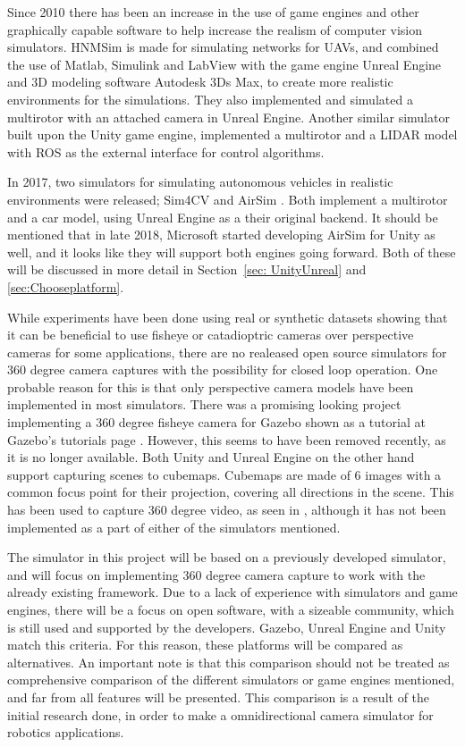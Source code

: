 Since 2010 there has been an increase in the use of game engines and other graphically capable software to help increase the realism of computer vision simulators. HNMSim \cite{HNMSimPaper} is made for simulating networks for UAVs, and combined the use of Matlab, Simulink and LabView with the game engine Unreal Engine and 3D modeling software Autodesk 3Ds Max, to create more realistic environments for the simulations. They also implemented and simulated a multirotor with an attached camera in Unreal Engine. Another similar simulator\cite{UnityROSsim} built upon the Unity game engine, implemented a multirotor and a LIDAR model with ROS as the external interface for control algorithms.

In 2017, two simulators for simulating autonomous vehicles in realistic environments were released; Sim4CV \cite{Sim4CV_paper} and AirSim \cite{Airsim_paper}. Both implement a multirotor and a car model, using Unreal Engine as a their original backend. It should be mentioned that in late 2018, Microsoft started developing AirSim for Unity as well, and it looks like they will support both engines going forward. Both of these will be discussed in more detail in Section~\ref{sec: UnityUnreal} and \ref{sec:Chooseplatform}.

While experiments have been done using real or synthetic datasets showing that it can be beneficial to use fisheye or catadioptric cameras over perspective cameras \cite{Zhang2016BenefitOL, OmniVIOKalman, CompOmniVSLAM} for some applications, there are no realeased open source simulators for 360 degree camera captures with the possibility for closed loop operation. One probable reason for this is that only perspective camera models have been implemented in most simulators. There was a promising looking project implementing a 360 degree fisheye camera for Gazebo shown as a tutorial at Gazebo's tutorials page \cite{GazeboWideWeb}. However, this seems to have been removed recently, as it is no longer available. Both Unity and Unreal Engine on the other hand support capturing scenes to cubemaps. Cubemaps are made of 6 images with a common focus point for their projection, covering all directions in the scene. This has been used to capture 360 degree video, as seen in \cite{UnityCubeCapture, UnrealCubeCapture}, although it has not been implemented as a part of either of the simulators mentioned. 

The simulator in this project will be based on a previously developed simulator, and will focus on implementing 360 degree camera capture to work with the already existing framework. Due to a lack of experience with simulators and game engines, there will be a focus on open software, with a sizeable community, which is still used and supported by the developers. Gazebo, Unreal Engine and Unity match this criteria. For this reason, these platforms will be compared as alternatives. An important note is that this comparison should not be treated as comprehensive comparison of the different simulators or game engines mentioned, and far from all features will be presented. This comparison is a result of the initial research done, in order to make a omnidirectional camera simulator for robotics applications.

